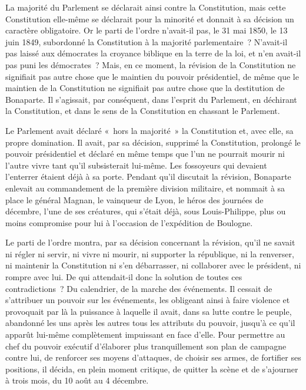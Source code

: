 \documentclass[french,twoside]{book} %
\begin{document}
La majorité du Parlement se déclarait ainsi contre la Constitution, mais cette Constitution elle-même se déclarait pour la minorité et donnait à sa décision un caractère obligatoire. Or le parti de l’ordre n’avait-il pas, le 31 mai 1850, le 13 juin 1849, subordonné la Constitution à la majorité parlementaire ? N’avait-il pas laissé aux démocrates la croyance biblique en la terre de la loi, et n’en avait-il pas puni les démocrates ? Mais, en ce moment, la révision de la Constitution ne signifiait pas autre chose que le maintien du pouvoir présidentiel, de même que le maintien de la Constitution ne signifiait pas autre chose que la destitution de Bonaparte. Il s’agissait, par conséquent, dans l’esprit du Parlement, en déchirant la Constitution, et dans le sens de la Constitution en chassant le Parlement.\par
Le Parlement avait déclaré « hors la majorité » la Constitution et, avec elle, sa propre domination. Il avait, par sa décision, supprimé la Constitution, prolongé le pouvoir présidentiel et déclaré en même temps que l’un ne pourrait mourir ni l’autre vivre tant qu’il subsisterait lui-même. Les fossoyeurs qui devaient l’enterrer étaient déjà à sa porte. Pendant qu’il discutait la révision, Bonaparte enlevait au commandement de la première division militaire, et nommait à sa place le général Magnan, le vainqueur de Lyon, le héros des journées de décembre, l’une de ses créatures, qui s’était déjà, sous Louis-Philippe, plus ou moins compromise pour lui à l’occasion de l’expédition de Boulogne.\par
Le parti de l’ordre montra, par sa décision concernant la révision, qu’il ne savait ni régler ni servir, ni vivre ni mourir, ni supporter la république, ni la renverser, ni maintenir la Constitution ni s’en débarrasser, ni collaborer avec le président, ni rompre avec lui. De qui attendait-il donc la solution de toutes ces contradictions ? Du calendrier, de la marche des événements. Il cessait de s’attribuer un pouvoir sur les événements, les obligeant ainsi à faire violence et provoquait par là la puissance à laquelle il avait, dans sa lutte contre le peuple, abandonné les uns après les autres tous les attributs du pouvoir, jusqu’à ce qu’il apparût lui-même complètement impuissant en face d’elle. Pour permettre au chef du pouvoir exécutif d’élaborer plus tranquillement son plan de campagne contre lui, de renforcer ses moyens d’attaques, de choisir ses armes, de fortifier ses positions, il décida, en plein moment critique, de quitter la scène et de s’ajourner à trois mois, du 10 août au 4 décembre.\par
\end{document}
